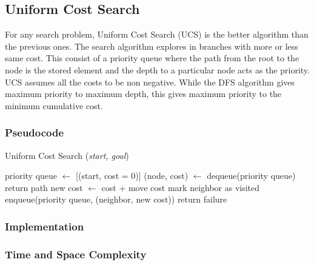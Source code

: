 \subsection{Uniform Cost Search}
\noindent For any search problem, Uniform Cost Search (UCS) is the better algorithm than the previous ones. The search algorithm explores in branches with more or less same cost. This consist of a priority queue where the path from the root to the node is the stored element and the depth to a particular node acts as the priority. UCS assumes all the costs to be non negative. While the DFS algorithm gives maximum priority to maximum depth, this gives maximum priority to the minimum cumulative cost.

\subsubsection{Pseudocode}
\begin{algorithm}[H]
	\caption{Uniform Cost Search (\textit{start, goal})}
	\label{alg:ucs}
	\begin{algorithmic}[1]
	\State priority queue \(\gets\) [(start, cost = 0)]
		\State (node, cost) \(\gets\) dequeue(priority queue)
			\State return path
		\EndIf
			\State new cost \(\gets\) cost + move cost
				\State mark neighbor as visited
				\State enqueue(priority queue, (neighbor, new cost))
			\EndIf
		\EndFor
	\EndWhile
	\State return failure
	\end{algorithmic}
\end{algorithm}

\subsubsection{Implementation}

\subsubsection{Time and Space Complexity}

